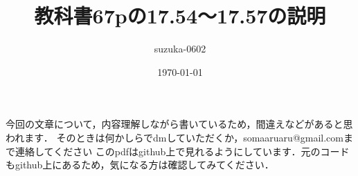 \documentclass{jsarticle}
\title{教科書67pの17.54〜17.57の説明}
\author{suzuka-0602}
\date{\today}
\numberwithin{equation}{section}
\theoremstyle{definition}
\begin{document}
\maketitle

今回の文章について，内容理解しながら書いているため，間違えなどがあると思われます．
そのときは何かしらでdmしていただくか，somaaruaru@gmail.comまで連絡してください
このpdfはgithub上で見れるようにしています．元のコードもgithub上にあるため，気になる方は確認してみてください．
\end{document}
